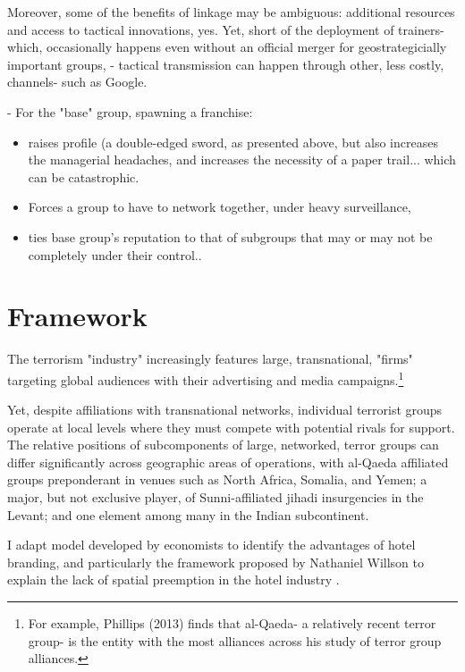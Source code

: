 \documentclass{article}
\begin{document}
Moreover, some of the benefits of linkage may be ambiguous: additional
resources and access to tactical innovations, yes. Yet, short of the
deployment of trainers- which, occasionally happens even without an
official merger for geostrategicially important groups, 
- tactical transmission can happen through other, less costly,
channels- such as Google.
 
- For the "base" group, spawning a franchise:
\begin{itemize}
\item raises profile (a double-edged sword, as
presented above, but also increases the managerial headaches, and
increases the necessity of a paper trail... which can be
catastrophic.
 \item Forces a group to have to network together, under heavy
surveillance,
\item ties base group's reputation to that of subgroups that
may or may not be completely under their control.. %
\end{itemize}
 
\section{Framework}

The terrorism "industry" increasingly features large, transnational, "firms" targeting
global audiences with their advertising and media campaigns.\footnote{For
example, Phillips (2013) finds that al-Qaeda- a relatively recent terror group- is the entity with the
most alliances across his study of terror group alliances.}

Yet, despite affiliations with transnational networks, individual
terrorist groups operate at local levels where they must compete with
potential rivals for support. The relative positions of subcomponents
of large, networked, terror groups can differ significantly across
geographic areas of operations, with al-Qaeda affiliated groups
preponderant in venues such as North Africa, Somalia, and Yemen; a
major, but not exclusive player, of Sunni-affiliated jihadi insurgencies
in the Levant; and one element among many in the Indian subcontinent.    

I adapt model developed by economists to identify the advantages of
hotel branding, and particularly the framework proposed by Nathaniel
Willson to explain the lack of spatial preemption in the hotel
industry \cite{wilson2011branding}.  
\end{document}
